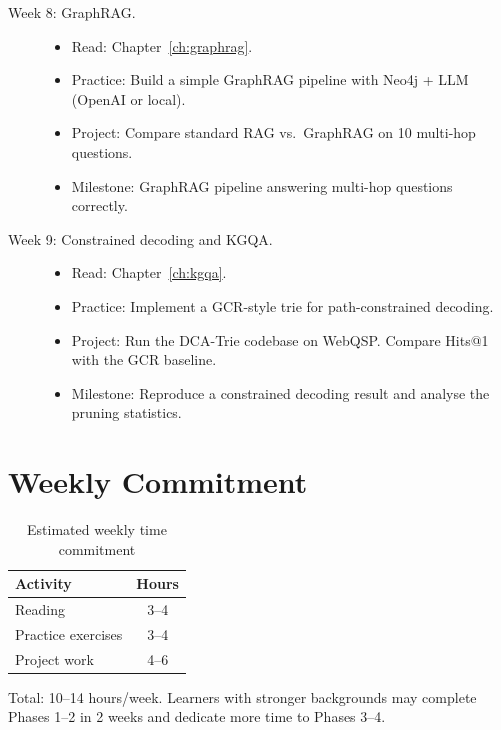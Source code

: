 \documentclass[11pt,a4paper,oneside,openany]{book}
\theoremstyle{definition}
\theoremstyle{plain}
\theoremstyle{remark}
\begin{document}
\begin{description}
	\item[Week 8: GraphRAG.]
	      \begin{itemize}
		      \item Read: Chapter~\ref{ch:graphrag}.
		      \item Practice: Build a simple GraphRAG pipeline with Neo4j + LLM (OpenAI or local).
		      \item Project: Compare standard RAG vs.\ GraphRAG on 10 multi-hop questions.
		      \item Milestone: GraphRAG pipeline answering multi-hop questions correctly.
	      \end{itemize}

	\item[Week 9: Constrained decoding and KGQA.]
	      \begin{itemize}
		      \item Read: Chapter~\ref{ch:kgqa}.
		      \item Practice: Implement a GCR-style trie for path-constrained decoding.
		      \item Project: Run the DCA-Trie codebase on WebQSP. Compare Hits@1 with the GCR baseline.
		      \item Milestone: Reproduce a constrained decoding result and analyse the pruning statistics.
	      \end{itemize}
\end{description}

\section{Weekly Commitment}\label{sec:commitment}

\begin{table}[h]
	\centering
	\caption{Estimated weekly time commitment}
	\label{tab:commitment}
	\begin{tabular}{lc}
		\toprule
		Activity           & Hours \\
		\midrule
		Reading            & 3--4  \\
		Practice exercises & 3--4  \\
		Project work       & 4--6  \\
		\bottomrule
	\end{tabular}
\end{table}

Total: 10--14 hours/week. Learners with stronger backgrounds may complete Phases 1--2 in 2 weeks and dedicate more time to Phases 3--4.
\end{document}
